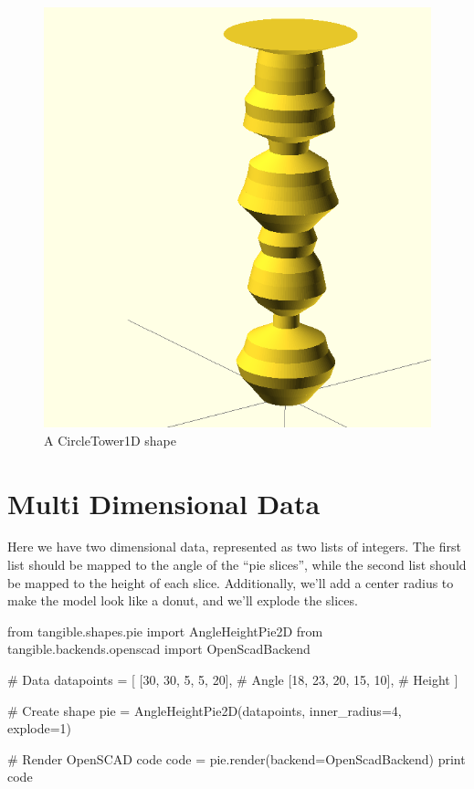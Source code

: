 \begin{figure}[H]
	\centering
	\includegraphics[height=.25\textheight]{images/tower.png}
	\caption{A CircleTower1D shape}
	\label{img:tower}
\end{figure}


\newpage
\section{Multi Dimensional Data}\label{sec:multidimensional}

Here we have two dimensional data, represented as two lists of integers. The
first list should be mapped to the angle of the ``pie slices'', while the second
list should be mapped to the height of each slice. Additionally, we'll add a
center radius to make the model look like a donut, and we'll explode the slices.

\vspace{.5\baselineskip}
\begin{pythoncode}
from tangible.shapes.pie import AngleHeightPie2D
from tangible.backends.openscad import OpenScadBackend

# Data
datapoints = [
    [30, 30, 5, 5, 20], # Angle
    [18, 23, 20, 15, 10], # Height
]

# Create shape
pie = AngleHeightPie2D(datapoints, inner_radius=4, explode=1)

# Render OpenSCAD code
code = pie.render(backend=OpenScadBackend)
print code
\end{pythoncode}
\vspace{.5\baselineskip}

